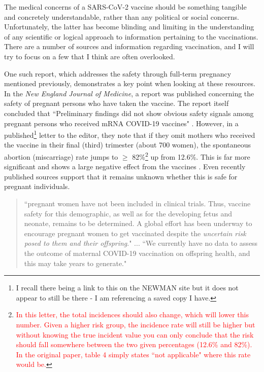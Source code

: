 \documentclass[10pt, a4paper, twocolumn]{book}
\begin{document}
The medical concerns of a SARS-CoV-2 vaccine should be something tangible and concretely understandable, rather than any political or social concerns. Unfortunately, the latter has become blinding and limiting in the understanding of any scientific or logical approach to information pertaining to the vaccinations. There are a number of sources and information regarding vaccination, and I will try to focus on a few that I think are often overlooked. 

One such report, which addresses the safety through full-term pregnancy mentioned previously, demonstrates a key point when looking at these resources. In the \textit{New England Journal of Medicine}, a report was published concerning the safety of pregnant persons who have taken the vaccine. The report itself concluded that ``Preliminary findings did not show obvious safety signals among pregnant persons who received mRNA COVID-19 vaccines" \citep{NEJMPregnancyVaccine}. However, in a published\footnote{I recall there being a link to this on the NEWMAN site but it does not appear to still be there - I am referencing a saved copy I have.} letter to the editor, they note that if they omit mothers who received the vaccine in their final (third) trimester (about 700 women), the spontaneous abortion (miscarriage) rate jumps to $\geq$ 82\%\footnote{\textcolor{Red}{In this letter, the total incidences should also change, which will lower this number. Given a higher risk group, the incidence rate will still be higher but without knowing the true incident value you can only conclude that the risk should fall somewhere between the two given percentages (12.6\% and 82\%). In the original paper, table 4 simply states ``not applicable" where this rate would be.}} up from 12.6\%. This is far more significant and shows a large negative effect from the vaccines \citep{NEJMPregnancyVaccineCorrespondance}. Even recently published sources support that it remains unknown whether this is safe for pregnant individuals. 

\begin{quotation}
	``pregnant women have not been included in clinical trials. Thus, vaccine safety for this demographic, as well as for the developing fetus and neonate, remains to be determined. A global effort has been underway to encourage pregnant women to get vaccinated despite the \textit{uncertain risk posed to them and their offspring}." ... ``We currently have no data to assess the outcome of maternal COVID-19 vaccination on offspring health, and this may take years to generate." \citep{MaternalVaccinationImpacts}
\end{quotation}
\end{document}
